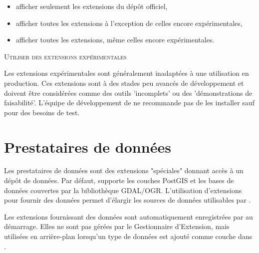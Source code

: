 \begin{itemize}[label=--]
\item afficher seulement les extensions du dépôt officiel,
\item afficher toutes les extensions à l'exception de celles encore expérimentales,
\item afficher toutes les extensions, même celles encore expérimentales.
\end{itemize}

\begin{Tip}
 \caption{\textsc{Utiliser des extensions expérimentales}}

Les extensions expérimentales sont généralement inadaptées à une utilisation en 
production. Ces extensions sont à des stades peu avancés de développement et 
doivent être considérées comme des outils 'incomplets' ou des 'démonstrations 
de faisabilité'. L'équipe de développement de \qg ne recommande pas de les 
installer sauf pour des besoins de test.
\end{Tip}

\section{Prestataires de données}


Les prestataires de données sont des extensions "spéciales" donnant accès à un dépôt de données.
Par défaut, \qg supporte les couches PostGIS et les bases de données couvertes par la bibliothèque GDAL/OGR.
L'utilisation d'extensions pour fournir des données permet d'élargir les sources de données utilisables par \qg.

Les extensions fournissant des données sont automatiquement enregistrées par \qg au démarrage.
Elles ne sont pas gérées par le Gestionnaire d'Extension, mais utilisées en arrière-plan lorsqu'un type de données est ajouté comme couche dans \qg.